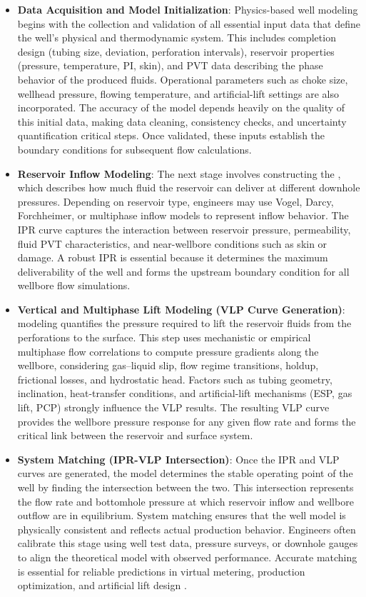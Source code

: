 \documentclass[12pt,APA]{uomthesis}
\begin{document}
\begin{itemize}
    \item \textbf{Data Acquisition and Model Initialization}:
    Physics-based well modeling begins with the collection and validation of all essential input data that define the well's physical and thermodynamic system. This includes completion design (tubing size, deviation, perforation intervals), reservoir properties (pressure, temperature, PI, skin), and PVT data describing the phase behavior of the produced fluids. Operational parameters such as choke size, wellhead pressure, flowing temperature, and artificial-lift settings are also incorporated. The accuracy of the model depends heavily on the quality of this initial data, making data cleaning, consistency checks, and uncertainty quantification critical steps. Once validated, these inputs establish the boundary conditions for subsequent flow calculations.
    \item \textbf{Reservoir Inflow Modeling}:
    The next stage involves constructing the , which describes how much fluid the reservoir can deliver at different downhole pressures. Depending on reservoir type, engineers may use Vogel, Darcy, Forchheimer, or multiphase inflow models to represent inflow behavior. The IPR curve captures the interaction between reservoir pressure, permeability, fluid PVT characteristics, and near-wellbore conditions such as skin or damage. A robust IPR is essential because it determines the maximum deliverability of the well and forms the upstream boundary condition for all wellbore flow simulations.
    \item \textbf{Vertical and Multiphase Lift Modeling (VLP Curve Generation)}:
     modeling quantifies the pressure required to lift the reservoir fluids from the perforations to the surface. This step uses mechanistic or empirical multiphase flow correlations to compute pressure gradients along the wellbore, considering gas–liquid slip, flow regime transitions, holdup, frictional losses, and hydrostatic head. Factors such as tubing geometry, inclination, heat-transfer conditions, and artificial-lift mechanisms (ESP, gas lift, PCP) strongly influence the VLP results. The resulting VLP curve provides the wellbore pressure response for any given flow rate and forms the critical link between the reservoir and surface system.    
    \item \textbf{System Matching (IPR-VLP Intersection)}:
    Once the IPR and VLP curves are generated, the model determines the stable operating point of the well by finding the intersection between the two. This intersection represents the flow rate and bottomhole pressure at which reservoir inflow and wellbore outflow are in equilibrium. System matching ensures that the well model is physically consistent and reflects actual production behavior. Engineers often calibrate this stage using well test data, pressure surveys, or downhole gauges to align the theoretical model with observed performance. Accurate matching is essential for reliable predictions in virtual metering, production optimization, and artificial lift design \citep{vogel1968inflow, beggs1973study}.

\end{itemize}
\end{document}
